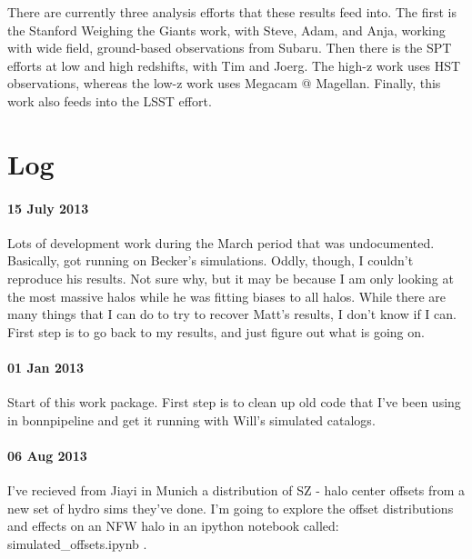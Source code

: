 \documentclass[11pt]{article}
\begin{document}
There are currently three analysis efforts that these results feed into. The first is the Stanford Weighing the Giants work, with Steve, Adam, and Anja, working with wide field, ground-based observations from Subaru. Then there is the SPT efforts at low and high redshifts, with Tim and Joerg. The high-z work uses HST observations, whereas the low-z work uses Megacam @ Magellan. Finally, this work also feeds into the LSST effort.


\clearpage \newpage


\section{Log}

\paragraph{15 July 2013}
Lots of development work during the March period that was undocumented. 
Basically, got running on Becker's simulations. 
Oddly, though, I couldn't reproduce his results. 
Not sure why, but it may be because I am only looking at the most massive halos while he was fitting biases to all halos.
While there are many things that I can do to try to recover Matt's results, I don't know if I can.
First step is to go back to my results, and just figure out what is going on.


\paragraph{01 Jan 2013}
Start of this work package. 
First step is to clean up old code that I've been using in bonnpipeline and get it running with Will's simulated catalogs.

\paragraph{06 Aug 2013}
I've recieved from Jiayi in Munich a distribution of SZ - halo center offsets from a new set of hydro sims they've done. I'm going to explore the offset distributions and effects on an NFW halo in an ipython notebook called: simulated\_offsets.ipynb .
\end{document}
